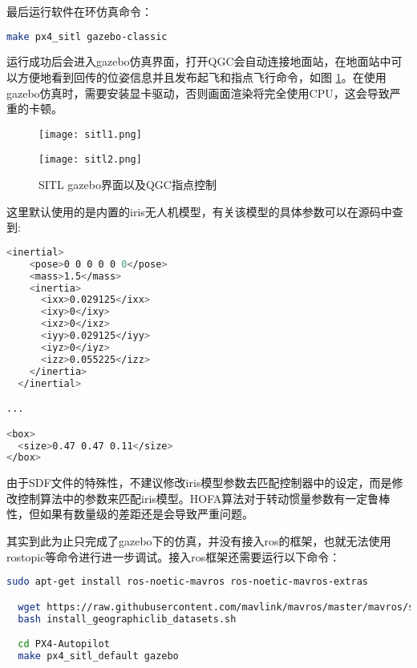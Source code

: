 最后运行软件在环仿真命令：

\begin{lstlisting}[language=Bash, basicstyle=\footnotesize, linewidth=\linewidth]
  make px4_sitl gazebo-classic
\end{lstlisting}

运行成功后会进入gazebo仿真界面，打开QGC会自动连接地面站，在地面站中可以方便地看到回传的位姿信息并且发布起飞和指点飞行命令，如图 \ref{sitl}。在使用gazebo仿真时，需要安装显卡驱动，否则画面渲染将完全使用CPU，这会导致严重的卡顿。

\begin{figure}[h]
  \centering
     \begin{minipage}[c]{0.45\textwidth}
      \centering
      \texttt{[image: sitl1.png]}
   \end{minipage}%
     \begin{minipage}[c]{0.45\textwidth}
      \centering
      \texttt{[image: sitl2.png]}
   \end{minipage}
   \caption{SITL gazebo界面以及QGC指点控制}
   \label{sitl}
 \end{figure}

 这里默认使用的是内置的iris无人机模型，有关该模型的具体参数可以在源码\cite{iris}中查到:
 \begin{lstlisting}[language=Bash, basicstyle=\footnotesize, linewidth=\linewidth]
  <inertial>
    <pose>0 0 0 0 0 0</pose>
    <mass>1.5</mass>
    <inertia>
      <ixx>0.029125</ixx>
      <ixy>0</ixy>
      <ixz>0</ixz>
      <iyy>0.029125</iyy>
      <iyz>0</iyz>
      <izz>0.055225</izz>
    </inertia>
  </inertial>

...

<box>
  <size>0.47 0.47 0.11</size>
</box>
 \end{lstlisting}
 
由于SDF文件的特殊性，不建议修改iris模型参数去匹配控制器中的设定，而是修改控制算法中的参数来匹配iris模型。HOFA算法对于转动惯量参数有一定鲁棒性，但如果有数量级的差距还是会导致严重问题。

其实到此为止只完成了gazebo下的仿真，并没有接入ros的框架，也就无法使用rostopic等命令进行进一步调试。接入ros框架还需要运行以下命令：

\begin{lstlisting}[language=Bash, basicstyle=\footnotesize, linewidth=\linewidth, breaklines=true]
  sudo apt-get install ros-noetic-mavros ros-noetic-mavros-extras

  wget https://raw.githubusercontent.com/mavlink/mavros/master/mavros/scripts/install_geographiclib_datasets.sh
  bash install_geographiclib_datasets.sh

  cd PX4-Autopilot
  make px4_sitl_default gazebo
\end{lstlisting}

